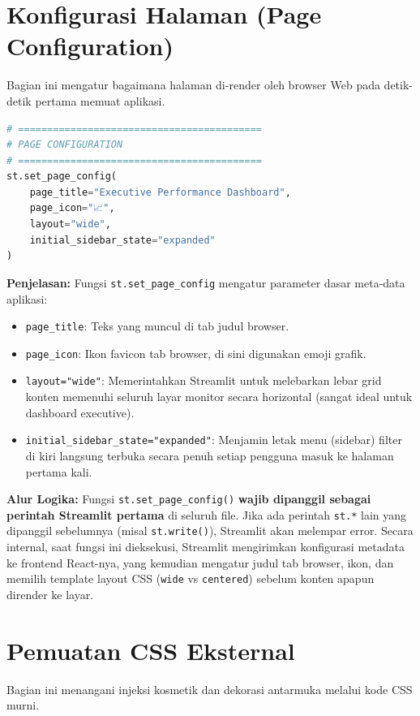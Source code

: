 \documentclass{article}
\begin{document}
\section{Konfigurasi Halaman (Page Configuration)}
Bagian ini mengatur bagaimana halaman di-render oleh browser Web pada detik-detik pertama memuat aplikasi.

\begin{lstlisting}[language=Python]
# ==========================================
# PAGE CONFIGURATION
# ==========================================
st.set_page_config(
    page_title="Executive Performance Dashboard",
    page_icon="📈",
    layout="wide",
    initial_sidebar_state="expanded"
)
\end{lstlisting}

\textbf{Penjelasan:}
Fungsi \texttt{st.set\_page\_config} mengatur parameter dasar meta-data aplikasi:
\begin{itemize}
	\item \texttt{page\_title}: Teks yang muncul di tab judul browser.
	\item \texttt{page\_icon}: Ikon favicon tab browser, di sini digunakan emoji grafik.
	\item \texttt{layout="wide"}: Memerintahkan Streamlit untuk melebarkan lebar grid konten memenuhi seluruh layar monitor secara horizontal (sangat ideal untuk dashboard executive).
	\item \texttt{initial\_sidebar\_state="expanded"}: Menjamin letak menu (sidebar) filter di kiri langsung terbuka secara penuh setiap pengguna masuk ke halaman pertama kali.
\end{itemize}

\textbf{Alur Logika:}
Fungsi \texttt{st.set\_page\_config()} \textbf{wajib dipanggil sebagai perintah Streamlit pertama} di seluruh file. Jika ada perintah \texttt{st.*} lain yang dipanggil sebelumnya (misal \texttt{st.write()}), Streamlit akan melempar error. Secara internal, saat fungsi ini dieksekusi, Streamlit mengirimkan konfigurasi metadata ke frontend React-nya, yang kemudian mengatur judul tab browser, ikon, dan memilih template layout CSS (\texttt{wide} vs \texttt{centered}) sebelum konten apapun dirender ke layar.

\section{Pemuatan CSS Eksternal}
Bagian ini menangani injeksi kosmetik dan dekorasi antarmuka melalui kode CSS murni.
\end{document}

